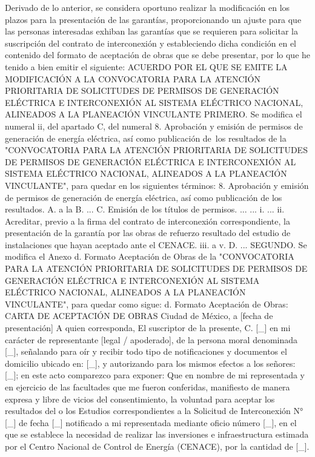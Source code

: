 Derivado de lo anterior, se considera oportuno realizar la modificación en los plazos para la presentación de las garantías, proporcionando un ajuste para que las personas interesadas exhiban las garantías que se requieren para solicitar la suscripción del contrato de interconexión y estableciendo dicha condición en el contenido del formato de aceptación de obras que se debe presentar, por lo que he tenido a bien emitir el siguiente:
ACUERDO POR EL QUE SE EMITE LA MODIFICACIÓN A LA CONVOCATORIA PARA LA ATENCIÓN PRIORITARIA DE SOLICITUDES DE PERMISOS DE GENERACIÓN ELÉCTRICA E INTERCONEXIÓN  AL SISTEMA ELÉCTRICO NACIONAL, ALINEADOS A LA PLANEACIÓN VINCULANTE
PRIMERO. Se modifica el numeral ii, del apartado C, del numeral 8. Aprobación y emisión de permisos de generación de energía eléctrica, así como publicación de los resultados de la "CONVOCATORIA PARA LA ATENCIÓN PRIORITARIA DE SOLICITUDES DE PERMISOS DE GENERACIÓN ELÉCTRICA E INTERCONEXIÓN AL SISTEMA ELÉCTRICO NACIONAL, ALINEADOS A LA PLANEACIÓN VINCULANTE", para quedar en los siguientes términos:
8. Aprobación y emisión de permisos de generación de energía eléctrica, así como publicación de los resultados.
A. a la B. ...
C. Emisión de los títulos de permisos.
...
...
i.	...
ii. 	Acreditar, previo a la firma del contrato de interconexión correspondiente, la presentación de la garantía por las obras de refuerzo resultado del estudio de instalaciones que hayan aceptado ante el CENACE.
iii. a v.
D. ...
SEGUNDO. Se modifica el Anexo d. Formato Aceptación de Obras de la "CONVOCATORIA PARA LA ATENCIÓN PRIORITARIA DE SOLICITUDES DE PERMISOS DE GENERACIÓN ELÉCTRICA E INTERCONEXIÓN AL SISTEMA ELÉCTRICO NACIONAL, ALINEADOS A LA PLANEACIÓN VINCULANTE", para quedar como sigue:
d. Formato Aceptación de Obras:
CARTA DE ACEPTACIÓN DE OBRAS
Ciudad de México, a [fecha de presentación]
A quien corresponda,
El suscriptor de la presente, C. [\_] en mi carácter de representante [legal / apoderado], de la persona moral denominada [\_], señalando para oír y recibir todo tipo de notificaciones y documentos el domicilio ubicado en: [\_], y autorizando para los mismos efectos a los señores: [\_]; en este acto comparezco para exponer:
Que en nombre de mi representada y en ejercicio de las facultades que me fueron conferidas, manifiesto de manera expresa y libre de vicios del consentimiento, la voluntad para aceptar los resultados del o los Estudios correspondientes a la Solicitud de Interconexión N° [\_] de fecha [\_] notificado a mi representada mediante oficio número [\_], en el que se establece la necesidad de realizar las inversiones e infraestructura estimada por el Centro Nacional de Control de Energía (CENACE), por la cantidad de [\_].
